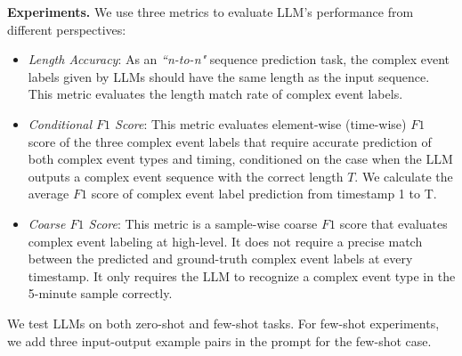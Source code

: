 \textbf{Experiments.} We use three metrics to evaluate LLM's performance from different perspectives:
\begin{itemize}%
    \item \textit{Length Accuracy}: As an \textit{``n-to-n"} sequence prediction task, the complex event labels given by LLMs should have the same length as the input sequence. This metric evaluates the length match rate of complex event labels. 
    \item \textit{Conditional $F1$ Score}: This metric evaluates element-wise (time-wise) $F1$ score of the three complex event labels that require accurate prediction of both complex event types and timing, conditioned on the case when the LLM outputs a complex event sequence with the correct length $T$. We calculate the average $F1$ score of complex event label prediction from timestamp 1 to T.
    \item \textit{Coarse $F1$ Score}: This metric is a sample-wise coarse $F1$ score that evaluates complex event labeling at high-level. It does not require a precise match between the predicted and ground-truth complex event labels at every timestamp. It only requires the LLM to recognize a complex event type in the 5-minute sample correctly.
\end{itemize}
We test LLMs on both zero-shot and few-shot tasks. For few-shot experiments, we add three input-output example pairs in the prompt for the few-shot case. 

